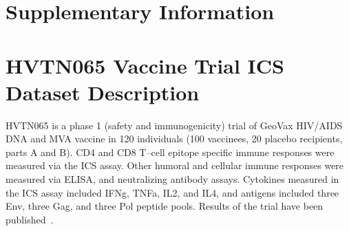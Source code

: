 \documentclass[11pt]{article}
\begin{document}
\renewcommand{\thesection}{S.\arabic{section}}
\renewcommand{\thesubsection}{\thesection.\arabic{subsection}}
\setcounter{section}{0}
\setcounter{subsection}{0}
\section*{Supplementary Information}
\section{HVTN065 Vaccine Trial ICS Dataset Description}
\label{supp:data}
HVTN065 is a phase 1 (safety and immunogenicity) trial of GeoVax HIV/AIDS DNA and MVA vaccine in 120 individuals (100 vaccinees, 20 placebo recipients, parts A and B). CD4 and CD8 T--cell epitope specific immune responses were measured via the ICS assay. Other humoral and cellular immune responses were measured via ELISA, and neutralizing antibody assays. Cytokines measured in the ICS assay included IFNg, TNFa, IL2, and IL4, and antigens included three Env, three Gag, and three Pol peptide pools. Results of the trial have been published~\citep{Goonetilleke:2006jk}.

 
 
\end{document}
